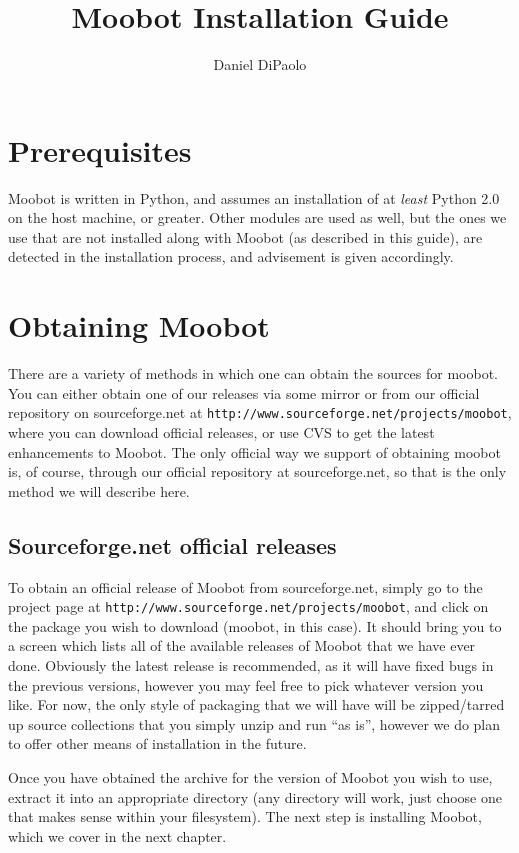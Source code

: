 \documentclass{article}
\author{Daniel DiPaolo}
\title{Moobot Installation Guide}
\begin{document}
\maketitle
\newpage

\tableofcontents
\newpage

\section{Prerequisites}
Moobot is written in Python, and assumes an installation of at \textit{least}
Python 2.0 on the host machine, or greater.  Other modules are used as well,
but the ones we use that are not installed along with Moobot (as described in
this guide), are detected in the installation process, and advisement is given
accordingly.


\section{Obtaining Moobot}
There are a variety of methods in which one can obtain the sources for moobot.
You can either obtain one of our releases via some mirror or from our official
repository on sourceforge.net at
\texttt{http://www.sourceforge.net/projects/moobot}, where you can download
official releases, or use CVS to get the latest enhancements to Moobot.  The
only official way we support of obtaining moobot is, of course, through our
official repository at sourceforge.net, so that is the only method we will
describe here.
\subsection{Sourceforge.net official releases}
To obtain an official release of Moobot from sourceforge.net, simply go to the
project page at \texttt{http://www.sourceforge.net/projects/moobot}, and click
on the package you wish to download (moobot, in this case).  It should bring
you to a screen which lists all of the available releases of Moobot that we
have ever done.  Obviously the latest release is recommended, as it will have
fixed bugs in the previous versions, however you may feel free to pick
whatever version you like.  For now, the only style of packaging that we will
have will be zipped/tarred up source collections that you simply unzip and run
``as is'', however we do plan to offer other means of installation in the
future.

Once you have obtained the archive for the version of Moobot you wish to use,
extract it into an appropriate directory (any directory will work, just choose
one that makes sense within your filesystem).  The next step is installing
Moobot, which we cover in the next chapter.
\end{document}
